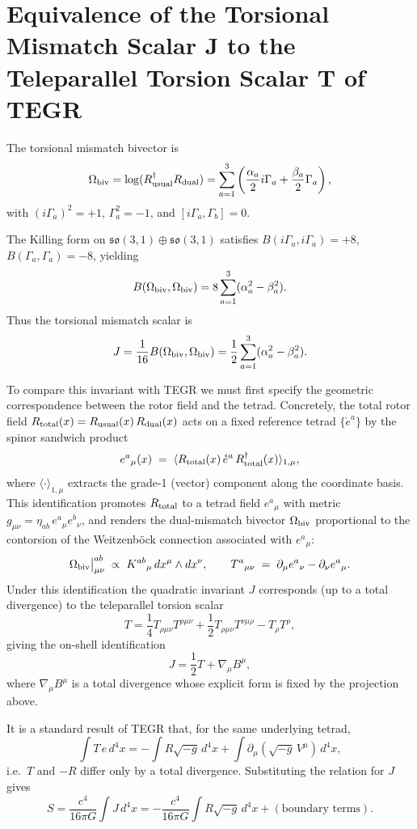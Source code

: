 \documentclass[dvipdfmx,a4paper]{article}
\begin{document}
\section{Equivalence of the Torsional Mismatch Scalar J to the Teleparallel Torsion Scalar T of TEGR}
\label{app:TEGR-equivalence}

The torsional mismatch bivector is
\[
\Omega_{\rm biv} = \log(R_{\rm usual}^\dagger R_{\rm dual}) = \sum_{a=1}^3 \left( \frac{\alpha_a}{2} i\Gamma_a + \frac{\beta_a}{2} \Gamma_a \right),
\]
with \( (i\Gamma_a)^2 = +1 \), \( \Gamma_a^2 = -1 \), and \([i\Gamma_a, \Gamma_b] = 0\).

The Killing form on \(\mathfrak{so}(3,1) \oplus \mathfrak{so}(3,1)\) satisfies \( B(i\Gamma_a, i\Gamma_a) = +8 \), \( B(\Gamma_a, \Gamma_a) = -8 \), yielding
\[
B(\Omega_{\rm biv}, \Omega_{\rm biv}) = 8 \sum_{a=1}^3 (\alpha_a^2 - \beta_a^2).
\]
Thus the torsional mismatch scalar is
\[
J = \frac{1}{16} B(\Omega_{\rm biv}, \Omega_{\rm biv}) = \frac12 \sum_{a=1}^3 (\alpha_a^2 - \beta_a^2).
\]

To compare this invariant with TEGR we must first specify the geometric correspondence between the rotor field and the tetrad. Concretely, the total rotor field $R_{\rm total}(x) = R_{\rm usual}(x)\, R_{\rm dual}(x)$ acts on a fixed reference tetrad $\{\mathring{e}^a\}$ by the spinor sandwich product
\[
e^a{}_\mu(x) \;=\; \langle R_{\rm total}(x)\, \mathring{e}^a\, R_{\rm total}^\dagger(x) \rangle_{1,\mu},
\]
where $\langle \cdot \rangle_{1,\mu}$ extracts the grade-1 (vector) component along the coordinate basis. This identification promotes $R_{\rm total}$ to a tetrad field $e^a{}_\mu$ with metric $g_{\mu\nu} = \eta_{ab}\, e^a{}_\mu e^b{}_\nu$, and renders the dual-mismatch bivector $\Omega_{\rm biv}$ proportional to the contorsion of the Weitzenb\"ock connection associated with $e^a{}_\mu$:
\[
\Omega_{\rm biv}\big|_{\mu\nu}^{ab} \;\propto\; K^{ab}{}_\mu\, dx^\mu \wedge dx^\nu,
\qquad
T^a{}_{\mu\nu} \;=\; \partial_\mu e^a{}_\nu - \partial_\nu e^a{}_\mu.
\]
Under this identification the quadratic invariant $J$ corresponds (up to a total divergence) to the teleparallel torsion scalar
\[
T = \frac14 T_{\rho\mu\nu}T^{\rho\mu\nu} + \frac12 T_{\rho\mu\nu}T^{\nu\mu\rho} - T_\rho T^\rho,
\]
giving the on-shell identification
\[
J = \frac12 T + \nabla_\mu B^\mu,
\]
where $\nabla_\mu B^\mu$ is a total divergence whose explicit form is fixed by the projection above.

It is a standard result of TEGR \cite{maluf2013} that, for the same underlying tetrad,
\[
\int T\, e\, d^4x = -\int R\sqrt{-g}\, d^4x + \int \partial_\mu(\sqrt{-g}\, V^\mu)\, d^4x,
\]
i.e.\ $T$ and $-R$ differ only by a total divergence. Substituting the relation for $J$ gives
\[
S = \frac{c^4}{16\pi G} \int J \, d^4x = -\frac{c^4}{16\pi G} \int R \sqrt{-g}\, d^4x + (\text{boundary terms}).
\]
\end{document}
